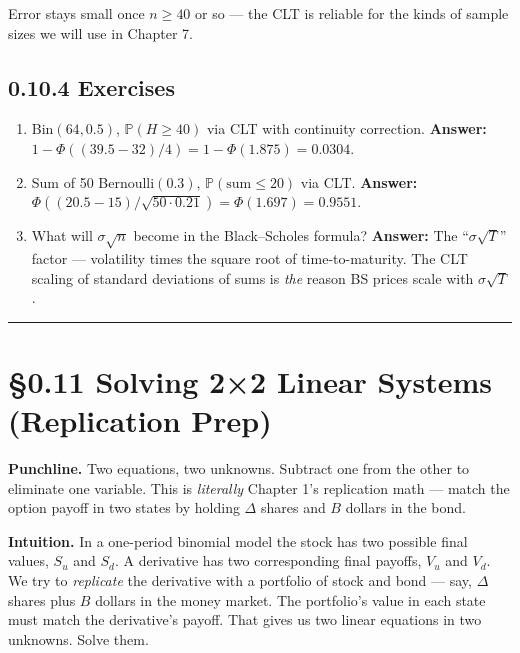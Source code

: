 \documentclass[
  10pt,
  twoside]{book}
\providecommand{\tightlist}{%
  \setlength{\itemsep}{0pt}\setlength{\parskip}{0pt}}
\begin{document}
Error stays small once \(n \geq 40\) or so --- the CLT is reliable for
the kinds of sample sizes we will use in Chapter 7.

\subsection{0.10.4 Exercises}\label{exercises-9}

\begin{enumerate}
\def\labelenumi{\arabic{enumi}.}
\tightlist
\item
  Bin\((64, 0.5)\), \(\mathbb{P}(H \geq 40)\) via CLT with continuity
  correction. \textbf{Answer:}
  \(1 - \Phi((39.5 - 32)/4) = 1 - \Phi(1.875) = 0.0304\).
\item
  Sum of 50 Bernoulli\((0.3)\), \(\mathbb{P}(\text{sum} \leq 20)\) via
  CLT. \textbf{Answer:}
  \(\Phi((20.5 - 15)/\sqrt{50 \cdot 0.21}) = \Phi(1.697) = 0.9551\).
\item
  What will \(\sigma \sqrt n\) become in the Black--Scholes formula?
  \textbf{Answer:} The ``\(\sigma \sqrt T\)'' factor --- volatility
  times the square root of time-to-maturity. The CLT scaling of standard
  deviations of sums is \emph{the} reason BS prices scale with
  \(\sigma \sqrt T\).
\end{enumerate}

\begin{center}\rule{0.5\linewidth}{0.5pt}\end{center}

\section{§0.11 Solving 2×2 Linear Systems (Replication
Prep)}\label{solving-22-linear-systems-replication-prep}

\textbf{Punchline.} Two equations, two unknowns. Subtract one from the
other to eliminate one variable. This is \emph{literally} Chapter 1's
replication math --- match the option payoff in two states by holding
\(\Delta\) shares and \(B\) dollars in the bond.

\textbf{Intuition.} In a one-period binomial model the stock has two
possible final values, \(S_u\) and \(S_d\). A derivative has two
corresponding final payoffs, \(V_u\) and \(V_d\). We try to
\emph{replicate} the derivative with a portfolio of stock and bond ---
say, \(\Delta\) shares plus \(B\) dollars in the money market. The
portfolio's value in each state must match the derivative's payoff. That
gives us two linear equations in two unknowns. Solve them.
\end{document}
